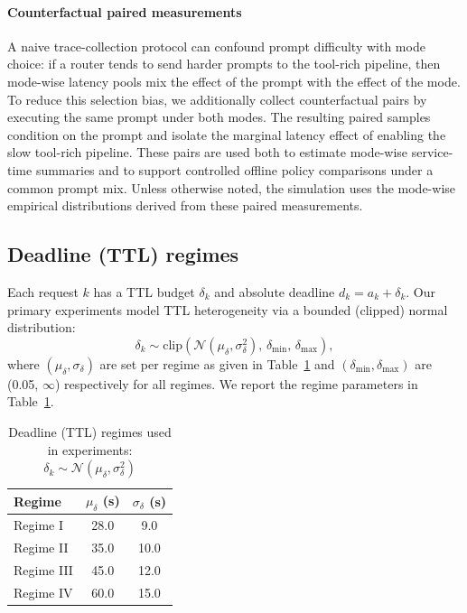 \documentclass[preprint,12pt]{elsarticle}
\begin{document}
\paragraph{Counterfactual paired measurements}
A naive trace-collection protocol can confound prompt difficulty with mode choice: if a router tends to send harder prompts to the tool-rich pipeline, then mode-wise latency pools mix the effect of the prompt with the effect of the mode. To reduce this selection bias, we additionally collect counterfactual pairs by executing the same prompt under both modes. The resulting paired samples condition on the prompt and isolate the marginal latency effect of enabling the slow tool-rich pipeline. These pairs are used both to estimate mode-wise service-time summaries and to support controlled offline policy comparisons under a common prompt mix. Unless otherwise noted, the simulation uses the mode-wise empirical distributions derived from these paired measurements.

\subsection{Deadline (TTL) regimes}
\label{sec:ttl_model}

Each request $k$ has a TTL budget $\delta_k$ and absolute deadline $d_k=a_k+\delta_k$. Our primary experiments model TTL heterogeneity via a bounded (clipped) normal distribution:
\begin{equation}
\delta_k \sim \mathrm{clip}\!\left(\mathcal{N}(\mu_\delta,\sigma_\delta^2),\, \delta_{\min},\, \delta_{\max}\right),
\label{eq:ttl_clipped_normal}
\end{equation}
where $(\mu_\delta,\sigma_\delta)$ are set per regime as given in Table~\ref{tab:ttl_regimes} and $(\delta_{\min},\delta_{\max})$ are (0.05, $\infty$) respectively for all regimes. We report the regime parameters in Table~\ref{tab:ttl_regimes}.

\begin{table}[t]
\centering
\caption{Deadline (TTL) regimes used in experiments: $\delta_k\sim\mathcal{N}(\mu_\delta,\sigma_\delta^2)$}
\label{tab:ttl_regimes}
\begin{tabular}{lcc}
\toprule
Regime & $\mu_\delta$ (s) & $\sigma_\delta$ (s) \\
\midrule
Regime I   & 28.0 & 9.0  \\
Regime II  & 35.0 & 10.0 \\
Regime III & 45.0 & 12.0 \\
Regime IV  & 60.0 & 15.0 \\
\bottomrule
\end{tabular}
\end{table}
\end{document}
